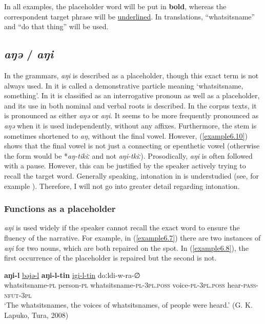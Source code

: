 \documentclass[output=paper,colorlinks,citecolor=brown]{langscibook}
\begin{document}
In all examples, the placeholder word will be put in \textbf{bold}, whereas the correspondent target phrase will be \uline{underlined}. In translations, “whatsitsname” and “do that thing” will be used.


\subsection{\textit{aŋə} / \textit{aŋi}}

In the  grammars, \textit{aŋi} is described as a placeholder, though this exact term is not always used. In \citet[265]{Konstantinova1964} it is called a demonstrative particle meaning ‘whatsitsname, something’. In \citet[24, 26]{BulatovaGrenoble1999} it is classified as an interrogative pronoun as well as a placeholder, and its use in both nominal and verbal roots is described. In the corpus texts, it is pronounced as either \textit{aŋə} or \textit{aŋi}. It seems to be more frequently pronounced as \textit{aŋə} when it is used independently, without any affixes. Furthermore, the stem is sometimes shortened to \textit{aŋ}, without the final vowel. However, (\ref{example6.10}) shows that the final vowel is not just a connecting or epenthetic vowel (otherwise the form would be *\textit{aŋ-tikiː} and not \textit{aŋi-tkiː}). Prosodically, \textit{aŋi} is often followed with a pause. However, this can be justified by the speaker actively trying to recall the target word. Generally speaking, intonation in  is understudied (see, for example \citealt{Morozova2019}). Therefore, I will not go into greater detail regarding intonation.


\subsubsection{Functions as a placeholder}

\textit{aŋi} is used widely if the speaker cannot recall the exact word to ensure the fluency of the narrative. For example, in (\ref{example6.7}) there are two instances of \textit{aŋi} for two nouns, which are both repaired on the spot. In (\ref{example6.8}), the first occurrence of the placeholder is repaired but the second is not.

\ea
    \label{example6.7}
    \gll \textbf{aŋi-l}	\uline{bəjə-l}	\textbf{aŋi-l-tin}	\uline{igi-l-tin}	doːldi-w-ra-∅\\
    whatsitsname-\textsc{pl}	person-\textsc{pl}	whatsitsname-\textsc{pl}-\textsc{3pl.poss}	voice-\textsc{pl}-\textsc{3pl.poss}	hear-\textsc{pass}-\textsc{nfut}-3\textsc{pl}\\
    \glt `The whatsitsnames, the voices of whatsitsnames, of people were heard.' (G. K. Lapuko, Tura, 2008)\\
    \z
\end{document}
